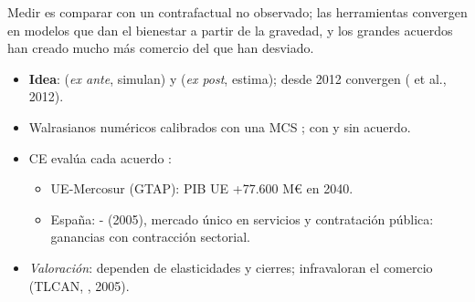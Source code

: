 \documentclass{article}
\begin{document}
\begin{columnas}
\begin{ideaclave}
Medir es comparar con un contrafactual no observado; las herramientas convergen en modelos que dan el bienestar a partir de la gravedad, y los grandes acuerdos han creado mucho más comercio del que han desviado.
\end{ideaclave}
\begin{itemize}
\item \textbf{Idea}:  (\emph{ex ante}, simulan) y  (\emph{ex post}, estima); desde 2012 convergen ( et al., 2012).
\end{itemize}

\begin{itemize}
\item Walrasianos numéricos calibrados con una MCS ; con y sin acuerdo.
\item CE evalúa cada acuerdo :
  \begin{itemize}
  \item UE-Mercosur (GTAP): PIB UE +77.600 M€ en 2040.
  \item España: - (2005), mercado único en servicios y contratación pública: ganancias con contracción sectorial.
  \end{itemize}
\item \emph{Valoración}: dependen de elasticidades y cierres; infravaloran el comercio (TLCAN, , 2005).
\end{itemize}


\end{columnas}
\end{document}
